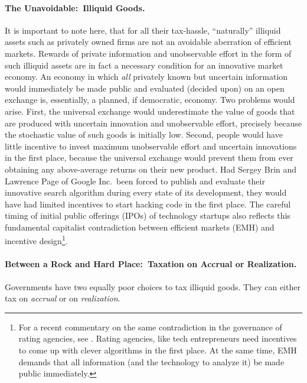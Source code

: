 \paragraph{The Unavoidable:~Illiquid Goods.} It is important to note here, that for all their tax-hassle, ``naturally'' illiquid assets such as privately owned firms are not an avoidable aberration of efficient markets.
Rewards of private information and unobservable effort in the form of such illiquid assets are in fact a necessary condition for an innovative market economy.
An economy in which \emph{all} privately known but uncertain information would immediately be made public and evaluated (decided upon) on an open exchange is, essentially, a planned, if democratic, economy.
 Two problems would arise.
First, the universal exchange would underestimate the value of goods that are produced with uncertain innovation and unobservable effort, precisely because the stochastic value of such goods is initially low.
Second, people would have little incentive to invest maximum unobservable effort and uncertain innovations in the first place, because the universal exchange would prevent them from ever obtaining any above-average returns on their new product.
Had Sergey Brin and Lawrence Page of Google Inc.\ been forced to publish and evaluate their innovative search algorithm during every state of its development, they would have had limited incentives to start hacking code in the first place.
The careful timing of initial public offerings (IPOs) of technology startups also reflects this fundamental capitalist contradiction between efficient markets (EMH) and incentive design\footnote{
	For a recent commentary on the same contradiction in the governance of rating agencies, see \citealt{TheEconomist2009}.
Rating agencies, like tech entrepreneurs need incentives to come up with clever algorithms in the first place.
At the same time, EMH demands that all information (and the technology to analyze it) be made public immediately.}.

\paragraph{Between a Rock and Hard Place:~Taxation on Accrual or Realization.} Governments have two equally poor choices to tax illiquid goods.
They can either tax on \emph{accrual} or on \emph{realization}.

